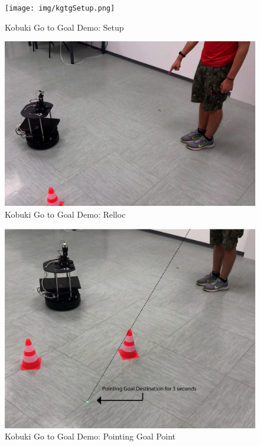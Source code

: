 \begin{figure}
	\centering
	\texttt{[image: img/kgtgSetup.png]}%
	\caption{Kobuki Go to Goal Demo: Setup}
	\label{fig:kgtgSetup}
\end{figure}
\begin{figure}
	\centering
	\includegraphics[width=\textwidth]{img/kgtgRelloc.png}%
	\caption{Kobuki Go to Goal Demo: Relloc}
	\label{fig:kgtgRelloc}
\end{figure}
\begin{figure}
	\centering
	\includegraphics[width=\textwidth]{img/kgtgPointing.png}%
	\caption{Kobuki Go to Goal Demo: Pointing Goal Point}
	\label{fig:kgtgPointing}
\end{figure}

